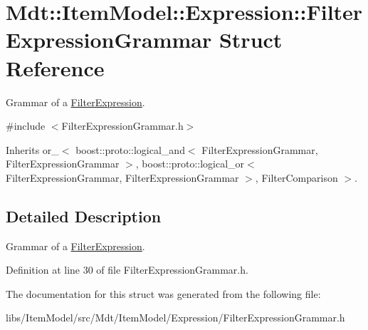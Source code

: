 \hypertarget{struct_mdt_1_1_item_model_1_1_expression_1_1_filter_expression_grammar}{}\section{Mdt\+:\+:Item\+Model\+:\+:Expression\+:\+:Filter\+Expression\+Grammar Struct Reference}
\label{struct_mdt_1_1_item_model_1_1_expression_1_1_filter_expression_grammar}


Grammar of a \hyperlink{class_mdt_1_1_item_model_1_1_filter_expression}{Filter\+Expression}.  




{\ttfamily \#include $<$Filter\+Expression\+Grammar.\+h$>$}



Inherits or\+\_\+$<$ boost\+::proto\+::logical\+\_\+and$<$ Filter\+Expression\+Grammar, Filter\+Expression\+Grammar $>$, boost\+::proto\+::logical\+\_\+or$<$ Filter\+Expression\+Grammar, Filter\+Expression\+Grammar $>$, Filter\+Comparison $>$.



\subsection{Detailed Description}
Grammar of a \hyperlink{class_mdt_1_1_item_model_1_1_filter_expression}{Filter\+Expression}. 

Definition at line 30 of file Filter\+Expression\+Grammar.\+h.



The documentation for this struct was generated from the following file\+:\begin{DoxyCompactItemize}
\item 
libs/\+Item\+Model/src/\+Mdt/\+Item\+Model/\+Expression/Filter\+Expression\+Grammar.\+h\end{DoxyCompactItemize}
